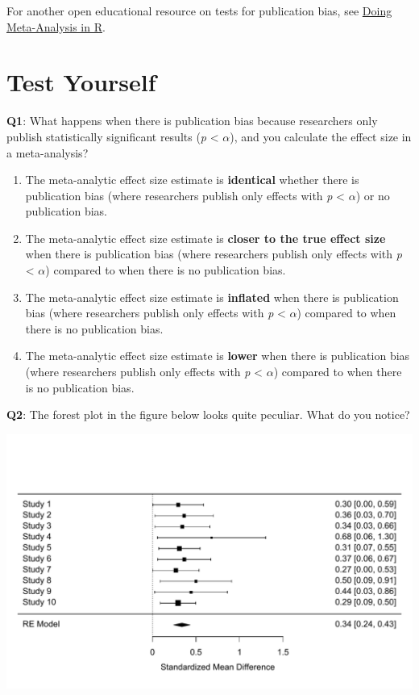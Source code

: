 \documentclass[
  oneside]{krantz}
\providecommand{\tightlist}{%
  \setlength{\itemsep}{0pt}\setlength{\parskip}{0pt}}
\begin{document}
For another open educational resource on tests for publication bias, see \href{https://bookdown.org/MathiasHarrer/Doing_Meta_Analysis_in_R/pub-bias.html}{Doing Meta-Analysis in R}.

\hypertarget{test-yourself-10}{%
\section{Test Yourself}\label{test-yourself-10}}

\textbf{Q1}: What happens when there is publication bias because researchers only publish statistically significant results (\emph{p} \textless{} \(\alpha\)), and you calculate the effect size in a meta-analysis?

\begin{enumerate}
\def\labelenumi{\Alph{enumi})}
\tightlist
\item
  The meta-analytic effect size estimate is \textbf{identical} whether there is publication bias (where researchers publish only effects with \emph{p} \textless{} \(\alpha\)) or no publication bias.
\item
  The meta-analytic effect size estimate is \textbf{closer to the true effect size} when there is publication bias (where researchers publish only effects with \emph{p} \textless{} \(\alpha\)) compared to when there is no publication bias.
\item
  The meta-analytic effect size estimate is \textbf{inflated} when there is publication bias (where researchers publish only effects with \emph{p} \textless{} \(\alpha\)) compared to when there is no publication bias.
\item
  The meta-analytic effect size estimate is \textbf{lower} when there is publication bias (where researchers publish only effects with \emph{p} \textless{} \(\alpha\)) compared to when there is no publication bias.
\end{enumerate}

\textbf{Q2}: The forest plot in the figure below looks quite peculiar. What do you notice?

\begin{center}\includegraphics[width=1\linewidth]{12-bias_files/figure-latex/metasimq2-1} \end{center}
\end{document}
